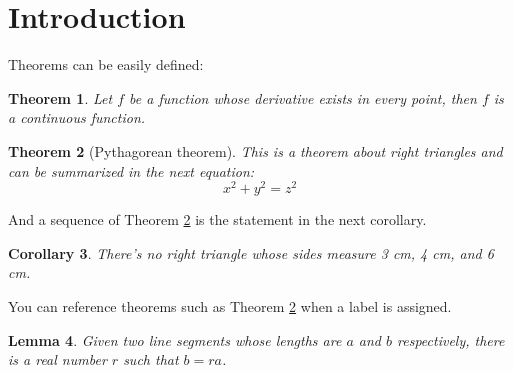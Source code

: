 \documentclass{article}
\newtheorem{theorem}{Theorem}[section]
\newtheorem{corollary}[theorem]{Corollary}
\newtheorem{lemma}[theorem]{Lemma}
\begin{document}
\section{Introduction}
Theorems can be easily defined:
\begin{theorem}
Let \(f\) be a function whose derivative exists in every point, then \(f\) is a continuous function.
\end{theorem}

\begin{theorem}[Pythagorean theorem]
\label{pythagorean}
This is a theorem about right triangles and can be summarized in the next equation:
\[ x^2 + y^2 = z^2 \]
\end{theorem}

And a sequence of Theorem \ref{pythagorean} is the statement in the next corollary.

\begin{corollary}
There's no right triangle whose sides measure 3 cm, 4 cm, and 6 cm.
\end{corollary}

You can reference theorems such as Theorem \ref{pythagorean} when a label is assigned.

\begin{lemma}
Given two line segments whose lengths are \(a\) and \(b\) respectively, there is a real number \(r\) such that \(b = ra\).
\end{lemma}
\end{document}
